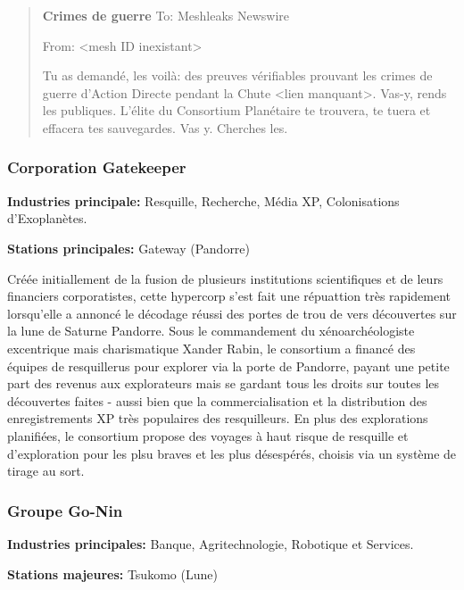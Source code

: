                   \begin{quotation} \textbf{Crimes de guerre} To: Meshleaks Newswire 

                     From: <mesh ID inexistant> 

                     Tu as demandé, les voilà: des preuves vérifiables prouvant les crimes de guerre d'Action Directe pendant la Chute <lien manquant>. Vas-y, rends les publiques. L'élite du Consortium Planétaire te trouvera, te tuera et effacera tes sauvegardes. Vas y. Cherches les. \end{quotation} 

                     \subsubsection{Corporation Gatekeeper} \label{sec:gatek-corp} 

                     \textbf{Industries principale:} Resquille, Recherche, Média XP, Colonisations d'Exoplanètes. 

                     \textbf{Stations principales:} Gateway (Pandorre) 

                     Créée initiallement de la fusion de plusieurs institutions scientifiques et de leurs financiers corporatistes, cette hypercorp s'est fait une répuattion très rapidement lorsqu'elle a annoncé le décodage réussi des portes de trou de vers découvertes sur la lune de Saturne Pandorre. Sous le commandement du xénoarchéologiste excentrique mais charismatique Xander Rabin, le consortium a financé des équipes de resquillerus pour explorer via la porte de Pandorre, payant une petite part des revenus aux explorateurs mais se gardant tous les droits sur toutes les découvertes faites - aussi bien que la commercialisation et la distribution des enregistrements XP très populaires des resquilleurs. En plus des explorations planifiées, le consortium propose des voyages à haut risque de resquille et d'exploration pour les plsu braves et les plus désespérés, choisis via un système de tirage au sort. 

                     \subsubsection{Groupe Go-Nin} \label{sec:go-nin-group} 

                     \textbf{Industries principales:} Banque, Agritechnologie, Robotique et Services. 

                     \textbf{Stations majeures:} Tsukomo (Lune) 

